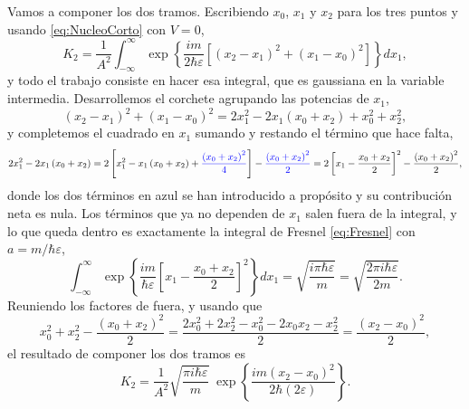         Vamos a componer los dos tramos. Escribiendo $x_{0}$, $x_{1}$ y $x_{2}$ para los tres puntos y usando \eqref{eq:NucleoCorto} con $V=0$,
        \begin{equation}\label{eq:ComposicionLibre1}
            K_{2} = \frac{1}{A^{2}}\int_{-\infty}^{\infty}\exp\left\{\frac{im}{2\hbar\varepsilon}\left[\left(x_{2}-x_{1}\right)^{2} + \left(x_{1}-x_{0}\right)^{2}\right]\right\}dx_{1},
        \end{equation}
        y todo el trabajo consiste en hacer esa integral, que es gaussiana en la variable intermedia. Desarrollemos el corchete agrupando las potencias de $x_{1}$,
        \begin{equation}\label{eq:ComposicionLibre2}
            \left(x_{2}-x_{1}\right)^{2} + \left(x_{1}-x_{0}\right)^{2}
            = 2x_{1}^{2} - 2x_{1}\left(x_{0}+x_{2}\right) + x_{0}^{2} + x_{2}^{2},
        \end{equation}
        y completemos el cuadrado en $x_{1}$ sumando y restando el término que hace falta,
        \begin{equation}\label{eq:ComposicionLibre3}
            2x_{1}^{2} - 2x_{1}\left(x_{0}+x_{2}\right)
            = 2\left[x_{1}^{2} - x_{1}\left(x_{0}+x_{2}\right) + \textcolor{blue}{\frac{\left(x_{0}+x_{2}\right)^{2}}{4}}\right] - \textcolor{blue}{\frac{\left(x_{0}+x_{2}\right)^{2}}{2}}
            = 2\left[x_{1}-\frac{x_{0}+x_{2}}{2}\right]^{2} - \frac{\left(x_{0}+x_{2}\right)^{2}}{2},
        \end{equation}
        donde los dos términos en azul se han introducido a propósito y su contribución neta es nula. Los términos que ya no dependen de $x_{1}$ salen fuera de la integral, y lo que queda dentro es exactamente la integral de Fresnel \eqref{eq:Fresnel} con $a = m/\hbar\varepsilon$,
        \begin{equation}\label{eq:ComposicionLibre4}
            \int_{-\infty}^{\infty}\exp\left\{\frac{im}{\hbar\varepsilon}\left[x_{1}-\frac{x_{0}+x_{2}}{2}\right]^{2}\right\}dx_{1} = \sqrt{\frac{i\pi\hbar\varepsilon}{m}} = \sqrt{\frac{2\pi i\hbar\varepsilon}{2m}} .
        \end{equation}
        Reuniendo los factores de fuera, y usando que
        \begin{equation}\label{eq:ComposicionLibre5}
            x_{0}^{2}+x_{2}^{2} - \frac{\left(x_{0}+x_{2}\right)^{2}}{2} = \frac{2x_{0}^{2}+2x_{2}^{2}-x_{0}^{2}-2x_{0}x_{2}-x_{2}^{2}}{2} = \frac{\left(x_{2}-x_{0}\right)^{2}}{2},
        \end{equation}
        el resultado de componer los dos tramos es
        \begin{equation}\label{eq:ComposicionLibre6}
            K_{2} = \frac{1}{A^{2}}\sqrt{\frac{\pi i\hbar\varepsilon}{m}}\;\exp\left\{\frac{im\left(x_{2}-x_{0}\right)^{2}}{2\hbar\left(2\varepsilon\right)}\right\} .
        \end{equation}

